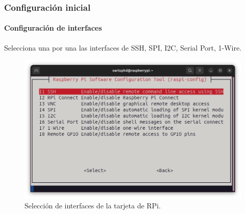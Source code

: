 \documentclass{beamer}
\begin{document}
		\begin{frame}
		\frametitle{Configuración inicial}
		\framesubtitle{Configuración de interfaces}
		Selecciona una por una las interfaces de SSH, SPI, I2C, Serial Port, 1-Wire.
		\begin{figure}
			\includegraphics[scale=0.3]{configrpi2.png}
			\caption{Selección de interfaces de la tarjeta de RPi. }
		\end{figure}
		
	\end{frame}
\end{document}
